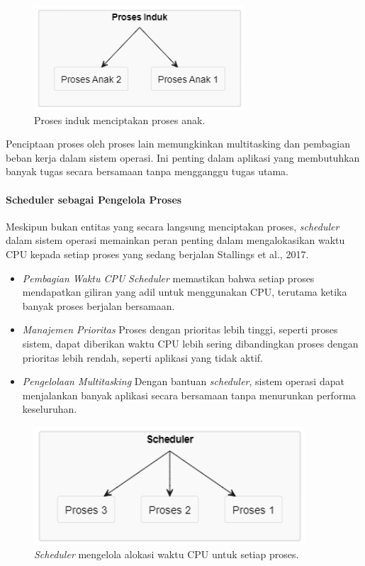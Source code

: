 \documentclass[12pt]{article}
\begin{document}
\begin{figure}[h]
    \centering
    \includegraphics[width=0.7\textwidth]{asset/parent child process creation.png}
    \caption{Proses induk menciptakan proses anak.}
\end{figure}

Penciptaan proses oleh proses lain memungkinkan multitasking dan pembagian beban kerja dalam sistem operasi. Ini penting dalam aplikasi yang membutuhkan banyak tugas secara bersamaan tanpa mengganggu tugas utama.

\paragraph{Scheduler sebagai Pengelola Proses}
Meskipun bukan entitas yang secara langsung menciptakan proses, \textit{scheduler} dalam sistem operasi memainkan peran penting dalam mengalokasikan waktu CPU kepada setiap proses yang sedang berjalan {Stallings et al., 2017}.

\begin{itemize}
    \item \textit{Pembagian Waktu CPU} \textit{Scheduler} memastikan bahwa setiap proses mendapatkan giliran yang adil untuk menggunakan CPU, terutama ketika banyak proses berjalan bersamaan.
    \item \textit{Manajemen Prioritas} Proses dengan prioritas lebih tinggi, seperti proses sistem, dapat diberikan waktu CPU lebih sering dibandingkan proses dengan prioritas lebih rendah, seperti aplikasi yang tidak aktif.
    \item \textit{Pengelolaan Multitasking} Dengan bantuan \textit{scheduler}, sistem operasi dapat menjalankan banyak aplikasi secara bersamaan tanpa menurunkan performa keseluruhan.
\end{itemize}

\begin{figure}[h]
    \centering
    \includegraphics[width=0.9\textwidth]{asset/scheduler cpu allocation.png}
    \caption{\textit{Scheduler} mengelola alokasi waktu CPU untuk setiap proses.}
\end{figure}
\end{document}
